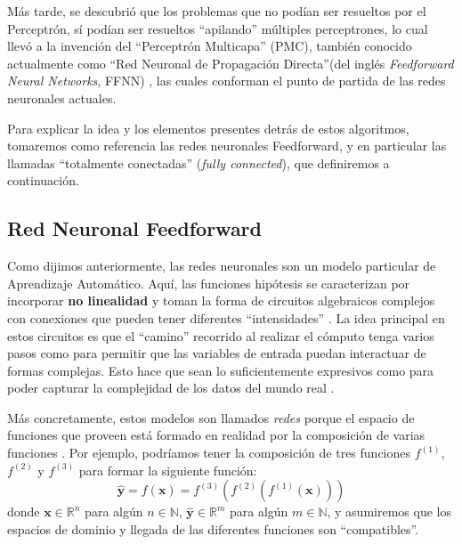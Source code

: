 \documentclass[../../main.tex]{subfiles}
\begin{document}
Más tarde, se descubrió que los problemas que no podían ser resueltos por el Perceptrón,
sí podían ser resueltos ``apilando'' múltiples perceptrones, lo cual llevó a la invención
del ``Perceptrón Multicapa'' (PMC), también conocido actualmente como ``Red Neuronal de
Propagación Directa''\footnotemark (del inglés \textit{Feedforward Neural Networks}, FFNN)
\cite{deep-learning}, las cuales conforman el punto de partida de las redes neuronales
actuales. 

Para explicar la idea y los elementos presentes detrás de estos algoritmos, tomaremos como
referencia las redes neuronales Feedforward, y en particular las llamadas ``totalmente
conectadas'' (\textit{fully connected}), que definiremos a continuación.

\subsection{Red Neuronal Feedforward}
Como dijimos anteriormente, las redes neuronales son un modelo particular de Aprendizaje
Automático. Aquí, las funciones hipótesis se caracterizan por incorporar \textbf{no
linealidad} y toman la forma de circuitos algebraicos complejos con conexiones que pueden
tener diferentes ``intensidades'' \cite{ai-a-modern-approach}. La idea principal en estos
circuitos es que el ``camino'' recorrido al realizar el cómputo tenga varios pasos como
para permitir que las variables de entrada puedan interactuar de formas complejas. Esto
hace que sean lo suficientemente expresivos como para poder capturar la complejidad de los
datos del mundo real \cite{ai-a-modern-approach}.

Más concretamente, estos modelos son llamados \textit{redes} porque el espacio de
funciones que proveen está formado en realidad por la composición de varias funciones
\cite{deep-learning}. Por ejemplo, podríamos tener la composición de tres funciones
\(f^{(1)}\), \(f^{(2)}\) y \(f^{(3)}\) para formar la siguiente función:
\begin{equation}
    \hat{\bm{y}} = f(\bm{x}) = f^{(3)}(f^{(2)}(f^{(1)}(\bm{x})))
    \label{eq:fun-composition}
\end{equation}
donde \(\bm{x} \in \mathbb{R}^n\) para algún \(n \in \mathbb{N}\), \(\hat{\bm{y}} \in
\mathbb{R}^m\) para algún \(m \in \mathbb{N}\), y asumiremos que los espacios de dominio y
llegada de las diferentes funciones son ``compatibles''.
\end{document}
